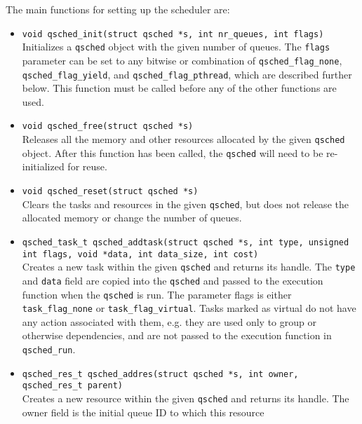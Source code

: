 \documentclass[fleqn,10pt]{wlpeerj}
\begin{document}
The main functions for setting up the scheduler are:
\begin{itemize}
    \item {\tt void qsched\_init(struct qsched *s, int nr\_queues, int flags)} \\
        Initializes a {\tt qsched} object with the given number of queues.
        The {\tt flags} parameter can be set to any bitwise or combination
        of {\tt qsched\_flag\_none},
        {\tt qsched\_flag\_yield}, and {\tt qsched\_flag\_pthread},
        which are described further below.
        This function must be called before any of the other
        functions are used.
        \vspace{1mm}
    \item {\tt void qsched\_free(struct qsched *s)} \\
        Releases all the memory and other resources allocated by the
        given {\tt qsched} object.
        After this function has been called, the {\tt qsched} will
        need to be re-initialized for reuse.
        \vspace{1mm}
    \item {\tt void qsched\_reset(struct qsched *s)} \\
        Clears the tasks and resources in the given {\tt qsched},
        but does not release the allocated memory or change
        the number of queues.
        \vspace{1mm}
    \item {\tt qsched\_task\_t qsched\_addtask(struct qsched *s, int type, unsigned int flags, void *data, int data\_size, int cost)} \\
        Creates a new task within the given {\tt qsched} and returns
        its handle.
        The {\tt type} and {\tt data} field are copied into the {\tt qsched}
        and passed to the execution function when the {\tt qsched} is run.
        The parameter flags is either {\tt task\_flag\_none} or
        {\tt task\_flag\_virtual}.
        Tasks marked as virtual do not have any action associated with them,
        e.g. they are used only to group or otherwise dependencies, and
        are not passed to the execution function in {\tt qsched\_run}.
        \vspace{1mm}
    \item {\tt qsched\_res\_t qsched\_addres(struct qsched *s, int owner, qsched\_res\_t parent)} \\
        Creates a new resource within the given {\tt qsched} and returns
        its handle.
        The owner field is the initial queue ID to which this resource

\end{itemize}
\end{document}
